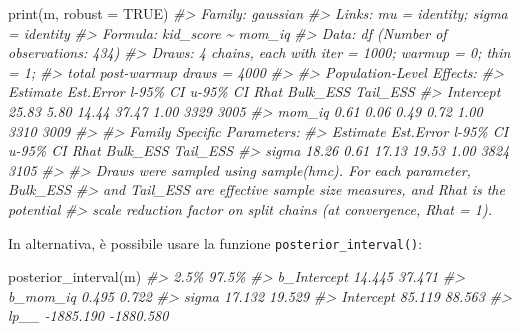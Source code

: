 \documentclass[
  10pt,
  italian,
  a4paper,
  extrafontsizes,onecolumn,openright
  ]{memoir}
\newenvironment{Shaded}{\begin{snugshade}}{\end{snugshade}}
\newcommand{\AttributeTok}[1]{\textcolor[rgb]{0.77,0.63,0.00}{#1}}
\newcommand{\CommentTok}[1]{\textcolor[rgb]{0.56,0.35,0.01}{\textit{#1}}}
\newcommand{\ConstantTok}[1]{\textcolor[rgb]{0.00,0.00,0.00}{#1}}
\newcommand{\FunctionTok}[1]{\textcolor[rgb]{0.00,0.00,0.00}{#1}}
\newcommand{\NormalTok}[1]{#1}
\begin{document}
\begin{Shaded}
\begin{Highlighting}[]
\FunctionTok{print}\NormalTok{(m, }\AttributeTok{robust =} \ConstantTok{TRUE}\NormalTok{)}
\CommentTok{\#\textgreater{}  Family: gaussian }
\CommentTok{\#\textgreater{}   Links: mu = identity; sigma = identity }
\CommentTok{\#\textgreater{} Formula: kid\_score \textasciitilde{} mom\_iq }
\CommentTok{\#\textgreater{}    Data: df (Number of observations: 434) }
\CommentTok{\#\textgreater{}   Draws: 4 chains, each with iter = 1000; warmup = 0; thin = 1;}
\CommentTok{\#\textgreater{}          total post{-}warmup draws = 4000}
\CommentTok{\#\textgreater{} }
\CommentTok{\#\textgreater{} Population{-}Level Effects: }
\CommentTok{\#\textgreater{}           Estimate Est.Error l{-}95\% CI u{-}95\% CI Rhat Bulk\_ESS Tail\_ESS}
\CommentTok{\#\textgreater{} Intercept    25.83      5.80    14.44    37.47 1.00     3329     3005}
\CommentTok{\#\textgreater{} mom\_iq        0.61      0.06     0.49     0.72 1.00     3310     3009}
\CommentTok{\#\textgreater{} }
\CommentTok{\#\textgreater{} Family Specific Parameters: }
\CommentTok{\#\textgreater{}       Estimate Est.Error l{-}95\% CI u{-}95\% CI Rhat Bulk\_ESS Tail\_ESS}
\CommentTok{\#\textgreater{} sigma    18.26      0.61    17.13    19.53 1.00     3824     3105}
\CommentTok{\#\textgreater{} }
\CommentTok{\#\textgreater{} Draws were sampled using sample(hmc). For each parameter, Bulk\_ESS}
\CommentTok{\#\textgreater{} and Tail\_ESS are effective sample size measures, and Rhat is the potential}
\CommentTok{\#\textgreater{} scale reduction factor on split chains (at convergence, Rhat = 1).}
\end{Highlighting}
\end{Shaded}

In alternativa, è possibile usare la funzione \texttt{posterior\_interval()}:

\begin{Shaded}
\begin{Highlighting}[]
\FunctionTok{posterior\_interval}\NormalTok{(m)}
\CommentTok{\#\textgreater{}                  2.5\%     97.5\%}
\CommentTok{\#\textgreater{} b\_Intercept    14.445    37.471}
\CommentTok{\#\textgreater{} b\_mom\_iq        0.495     0.722}
\CommentTok{\#\textgreater{} sigma          17.132    19.529}
\CommentTok{\#\textgreater{} Intercept      85.119    88.563}
\CommentTok{\#\textgreater{} lp\_\_        {-}1885.190 {-}1880.580}
\end{Highlighting}
\end{Shaded}
\end{document}
